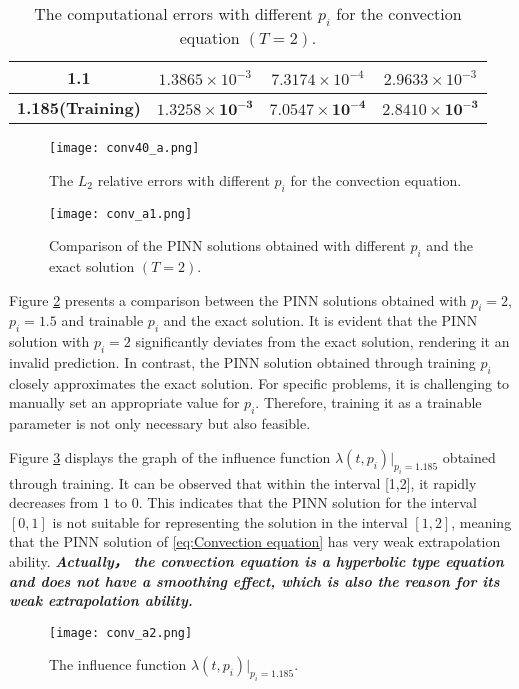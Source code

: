 \documentclass[preprint]{elsarticle}
\numberwithin{table}{section}
\numberwithin{equation}{section}
\numberwithin{figure}{section}
\begin{document}
\begin{CJK}{UTF8}{gbsn}
\begin{table}[htbp]
\begin{tabular}{c|ccc}
1.1 & $1.3865 \times 10^{-3}$ & $7.3174 \times 10^{-4}$ & $2.9633 \times 10^{-3}$ \\
   \hline
 {\textbf{1.185(Training)}} & { $\mathbf{1.3258 \times 10^{-3}}$}& {$\mathbf{ 7.0547 \times 10^{-4}}$} & {$\mathbf{2.8410 \times 10^{-3}}$}  \\
        \hline
    \end{tabular}
    \caption{
    The computational errors with different $p_i$ for the convection equation $(T=2)$.}
    \label{AE-table}
\end{table}




\begin{figure}[htbp]\label{AE_fig1}
\centering
\texttt{[image: conv40\_a.png]}
\caption{The  $L_2$ relative
errors with different $p_i$ for the convection equation.}
\end{figure}

\begin{figure}[htbp]
\centering
\texttt{[image: conv\_a1.png]}
\caption{
Comparison of the PINN solutions obtained with different $p_i$ and the exact solution $(T=2)$.}
\label{AE_fig2}
\end{figure}

Figure \ref{AE_fig2} presents a comparison between the PINN solutions obtained with $p_i=2$, $p_i=1.5$ and  {trainable $p_i$}  and the exact solution. It is evident that the PINN solution with $p_i=2$ significantly deviates from the exact solution, rendering it an invalid prediction. In contrast, the PINN solution obtained through training $p_i$
  closely approximates the exact solution. For specific problems, it is challenging to manually set an appropriate value for $p_i$. Therefore, training it as a trainable parameter is not only necessary but also feasible.


 Figure \ref{AE_fig3} displays the graph of the influence function $\lambda(t,p_i)|_{p_i=1.185}$
  obtained through training. It can be observed that within the interval [1,2], it rapidly decreases from $1$ to $0$. This indicates that the PINN solution for the interval $[0,1]$ is not suitable for representing the solution in the interval $[1,2]$, meaning that the PINN solution of \eqref{eq:Convection equation} has very weak extrapolation ability. \textbf{\textit{Actually， the convection equation is a hyperbolic type equation and does not have a smoothing effect, {which}  is also the reason for its weak extrapolation ability.}}
\begin{figure}[htbp]
\centering
\texttt{[image: conv\_a2.png]}
\caption{The influence function $\lambda(t,p_i)|_{p_i=1.185}$.}
\label{AE_fig3}
\end{figure}


\end{CJK}
\end{document}
